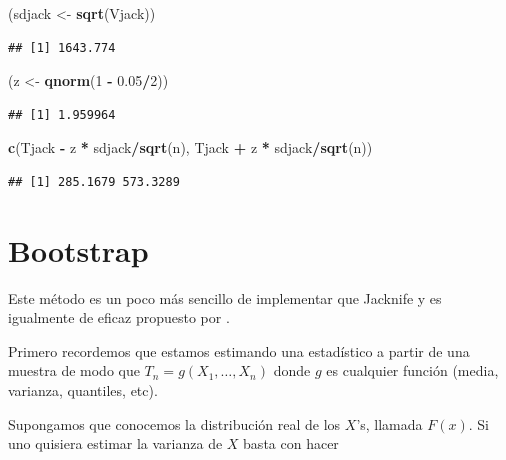 \documentclass[
  12pt,
]{book}
\newenvironment{Shaded}{\begin{snugshade}}{\end{snugshade}}
\newcommand{\DecValTok}[1]{\textcolor[rgb]{0.00,0.00,0.81}{#1}}
\newcommand{\FloatTok}[1]{\textcolor[rgb]{0.00,0.00,0.81}{#1}}
\newcommand{\KeywordTok}[1]{\textcolor[rgb]{0.13,0.29,0.53}{\textbf{#1}}}
\newcommand{\NormalTok}[1]{#1}
\newcommand{\OperatorTok}[1]{\textcolor[rgb]{0.81,0.36,0.00}{\textbf{#1}}}
\newcommand{\StringTok}[1]{\textcolor[rgb]{0.31,0.60,0.02}{#1}}
\theoremstyle{definition}
\theoremstyle{definition}
\theoremstyle{definition}
\theoremstyle{remark}
\begin{document}
\begin{Shaded}
\begin{Highlighting}[]
\NormalTok{(sdjack <-}\StringTok{ }\KeywordTok{sqrt}\NormalTok{(Vjack))}
\end{Highlighting}
\end{Shaded}

\begin{verbatim}
## [1] 1643.774
\end{verbatim}

\begin{Shaded}
\begin{Highlighting}[]
\NormalTok{(z <-}\StringTok{ }\KeywordTok{qnorm}\NormalTok{(}\DecValTok{1} \OperatorTok{-}\StringTok{ }\FloatTok{0.05}\OperatorTok{/}\DecValTok{2}\NormalTok{))}
\end{Highlighting}
\end{Shaded}

\begin{verbatim}
## [1] 1.959964
\end{verbatim}

\begin{Shaded}
\begin{Highlighting}[]
\KeywordTok{c}\NormalTok{(Tjack }\OperatorTok{-}\StringTok{ }\NormalTok{z }\OperatorTok{*}\StringTok{ }\NormalTok{sdjack}\OperatorTok{/}\KeywordTok{sqrt}\NormalTok{(n), Tjack }\OperatorTok{+}\StringTok{ }\NormalTok{z }\OperatorTok{*}\StringTok{ }\NormalTok{sdjack}\OperatorTok{/}\KeywordTok{sqrt}\NormalTok{(n))}
\end{Highlighting}
\end{Shaded}

\begin{verbatim}
## [1] 285.1679 573.3289
\end{verbatim}

\hypertarget{bootstrap}{%
\section{Bootstrap}\label{bootstrap}}

Este método es un poco más sencillo de implementar que Jacknife y es
igualmente de eficaz propuesto por \cite{Efron1979}.

Primero recordemos que estamos estimando una estadístico a partir de
una muestra de modo que \(T_{n}=g\left( X_{1},\ldots,X_{n} \right)\)
donde \(g\) es cualquier función (media, varianza, quantiles, etc).

Supongamos que conocemos la distribución real de los \(X\)'s, llamada \(F(x)\). Si uno
quisiera estimar la varianza de \(X\) basta con hacer
\end{document}

